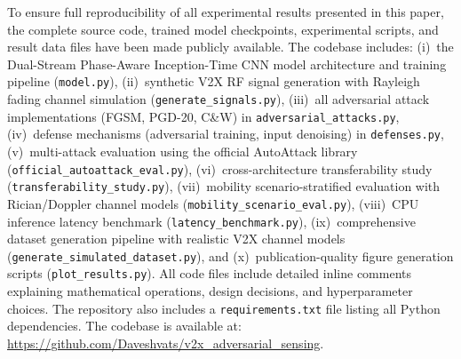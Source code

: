 \documentclass[conference]{IEEEtran}
\begin{document}
To ensure full reproducibility of all experimental results presented in this paper, the complete source code, trained model checkpoints, experimental scripts, and result data files have been made publicly available. The codebase includes: (i)~the Dual-Stream Phase-Aware Inception-Time CNN model architecture and training pipeline (\texttt{model.py}), (ii)~synthetic V2X RF signal generation with Rayleigh fading channel simulation (\texttt{generate\_signals.py}), (iii)~all adversarial attack implementations (FGSM, PGD-20, C\&W) in \texttt{adversarial\_attacks.py}, (iv)~defense mechanisms (adversarial training, input denoising) in \texttt{defenses.py}, (v)~multi-attack evaluation using the official AutoAttack library (\texttt{official\_autoattack\_eval.py}), (vi)~cross-architecture transferability study (\texttt{transferability\_study.py}), (vii)~mobility scenario-stratified evaluation with Rician/Doppler channel models (\texttt{mobility\_scenario\_eval.py}), (viii)~CPU inference latency benchmark (\texttt{latency\_benchmark.py}), (ix)~comprehensive dataset generation pipeline with realistic V2X channel models (\texttt{generate\_simulated\_dataset.py}), and (x)~publication-quality figure generation scripts (\texttt{plot\_results.py}). All code files include detailed inline comments explaining mathematical operations, design decisions, and hyperparameter choices. The repository also includes a \texttt{requirements.txt} file listing all Python dependencies. The codebase is available at: \url{https://github.com/Daveshvats/v2x_adversarial_sensing}.
\end{document}
